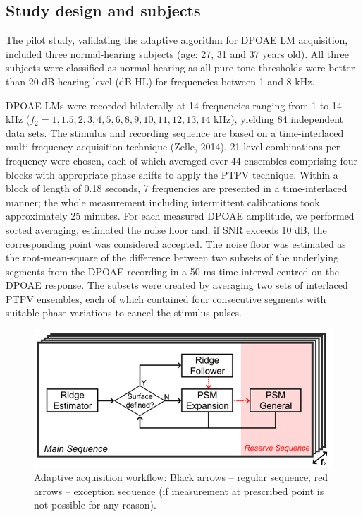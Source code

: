 \documentclass[journal,twoside,web]{ieeecolor2}
\begin{document}
\subsection{Study design and subjects}
\label{sec2_study}

The pilot study, validating the adaptive algorithm for DPOAE LM acquisition, included three normal-hearing subjects (age: 27, 31 and 37 years old).
All three subjects were classified as normal-hearing as all pure-tone thresholds were better than $20$ dB hearing level (dB HL) for frequencies between 1 and 8 kHz.

DPOAE LMs were recorded bilaterally at 14 frequencies ranging from 1 to 14 kHz ($f_2 = 1, 1.5, 2, 3, 4, 5, 6, 8, 9, 10, 11, 12, 13, 14$ kHz), yielding 84 independent data sets.
The stimulus and recording sequence are based on a time-interlaced multi-frequency acquisition technique (Zelle, 2014).
21 level combinations per frequency were chosen, each of which averaged over 44 ensembles comprising four blocks with appropriate phase shifts to apply the PTPV technique.
Within a block of length of 0.18 seconds, 7 frequencies are presented in a time-interlaced manner; the whole measurement including intermittent calibrations took approximately 25 minutes.
For each measured DPOAE amplitude, we performed sorted averaging, estimated the noise floor and, if SNR exceeds 10 dB, the corresponding point was considered accepted.
The noise floor was estimated as the root-mean-square of the difference between two subsets of the underlying segments from the DPOAE recording in a 50-ms time interval centred on the DPOAE response.
The subsets were created by averaging two sets of interlaced PTPV ensembles, each of which contained four consecutive segments with suitable phase variations to cancel the stimulus pulses.


\begin{figure}[ht]
\centerline{\includegraphics[width=\columnwidth]{Fig_Sequence.png}}
\caption{Adaptive acquisition workflow: Black arrows – regular sequence, red arrows – exception sequence (if measurement at prescribed point is not possible for any reason).}
\label{fig_SQS}
\end{figure}
\end{document}
